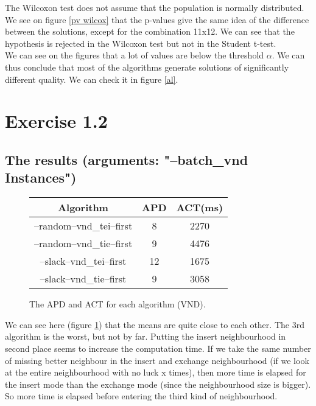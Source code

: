 The Wilcoxon test does not assume that the population is normally distributed. We see on figure \ref{pv wilcox} that the p-values give the same idea of the difference between the solutions, except for the combination 11x12. We can see that the hypothesis is rejected in the Wilcoxon test but not in the Student t-test.\\

We can see on the figures that a lot of values are below the threshold $\alpha$. We can thus conclude that most of the algorithms generate solutions of significantly different quality. We can check it in figure \ref{al}.


\section{Exercise 1.2}

\subsection{The results (arguments: "--batch\_vnd Instances")}

\begin{figure}[H]
\begin{center}
	\begin{tabular}{|c|c|c|} \hline
		Algorithm & APD & ACT(ms) \\ \hline \hline
		
		--random--vnd\_tei--first		& 8		& 2270 \\ \hline
		--random--vnd\_tie--first		& 9		& 4476 \\ \hline
		--slack--vnd\_tei--first		& 12		& 1675 \\ \hline
		--slack--vnd\_tie--first		& 9		& 3058 \\ \hline

	\end{tabular}
\end{center}
\caption{The APD and ACT for each algorithm (VND).}
\label{results vnd}
\end{figure}

We can see here (figure \ref{results vnd}) that the means are quite close to each other. The 3rd algorithm is the worst, but not by far. Putting the insert neighbourhood in second place seems to increase the computation time. If we take the same number of missing better neighbour in the insert and exchange neighbourhood (if we look at the entire neighbourhood with no luck x times), then more time is elapsed for the insert mode than the exchange mode (since the neighbourhood size is bigger). So more time is elapsed before entering the third kind of neighbourhood.

